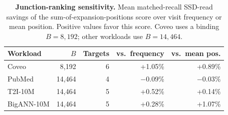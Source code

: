 \begin{table}[t]
\centering
\caption{\textbf{Junction-ranking sensitivity.} Mean matched-recall SSD-read savings of the sum-of-expansion-positions score over visit frequency or mean position. Positive values favor this score. Coveo uses a binding $B=8{,}192$; other workloads use $B=14{,}464$.}
\label{tab:eval-junction-scoring}
\small
\setlength{\tabcolsep}{2.5pt}
\begin{tabular}{@{}lrrrr@{}}
\toprule
Workload & $B$ & Targets & vs.\ frequency & vs.\ mean pos. \\
\midrule
Coveo & 8,192 & 6 & +1.05\% & +0.89\% \\
PubMed & 14,464 & 4 & $-$0.09\% & $-$0.03\% \\
T2I-10M & 14,464 & 5 & +0.52\% & +0.14\% \\
BigANN-10M & 14,464 & 5 & +0.28\% & +1.07\% \\
\bottomrule
\end{tabular}
\end{table}
